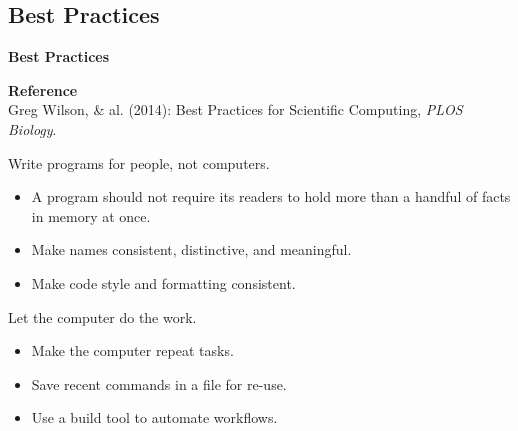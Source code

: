 
\begin{frame}\section{Best Practices}
\begin{center}\textbf{\huge Best Practices}\end{center}
\end{frame}


\begin{frame}\begin{center}
	\textbf{Reference}\\\vspace{0.3cm}
    Greg Wilson, \& al. (2014): Best Practices for Scientific Computing, \textit{PLOS Biology}.\nocite{Wilson.2014}
    \end{center}
\end{frame}

\begin{frame}
\begin{cenumerate*}
\item Write programs for people, not computers.\vspace{0.3cm}
	\begin{itemize}
	\item A program should not require its readers to hold more than a handful of facts in memory at once.\vspace{0.2cm}
	\item Make names consistent, distinctive, and meaningful.\vspace{0.2cm}
	\item Make code style and formatting consistent.
	\end{itemize}
\end{cenumerate*}
\end{frame}


\begin{frame}
\begin{cenumerate}
\item Let the computer do the work. \vspace{0.3cm}
	\begin{itemize}
	\item Make the computer repeat tasks.\vspace{0.2cm}
	\item Save recent commands in a file for re-use.\vspace{0.2cm}
	\item Use a build tool to automate workflows.
	\end{itemize}
\end{cenumerate}
\end{frame}

